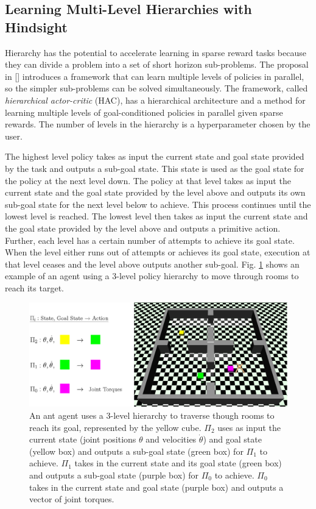 \documentclass[conference]{IEEEtran}
\begin{document}
\subsection{Learning Multi-Level Hierarchies with Hindsight}
Hierarchy has the potential to accelerate learning in sparse reward tasks because they can divide a problem into a set of short horizon sub-problems. The proposal in [\cite{levy2019learning}] introduces a framework that can learn multiple levels of policies in parallel, so the simpler sub-problems can be solved simultaneously. The framework, called \textit{hierarchical actor-critic} (HAC), has a hierarchical architecture and a method for learning multiple levels of goal-conditioned policies in parallel given sparse rewards. The number of levels in the hierarchy is a hyperparameter chosen by the user. 

The highest level policy takes as input the current state and goal state provided by the task and outputs a sub-goal state. This state is used as the goal state for the policy at the next level down. The policy at that level takes as input the current state and the goal state provided by the level above and outputs its own sub-goal state for the next level below to achieve. This process continues until the lowest level is reached. The lowest level then takes as input the current state and the goal state provided by the level above and outputs a primitive action. Further, each level has a certain number of attempts to achieve its goal state. When the level either runs out of attempts or achieves its goal state, execution at that level ceases and the level above outputs another sub-goal. Fig. \ref{fig:mutilevel_her_example} shows an example of an agent using a 3-level policy hierarchy to move through rooms to reach its target.
\begin{figure}[ht]
\centering
\includegraphics[width=0.9\columnwidth]{img/MultiLevelHER_example.png}
\caption{An ant agent uses a 3-level hierarchy to traverse though rooms to reach its goal, represented by the yellow cube. $\Pi_2$ uses as input the current state (joint positions $\theta$ and velocities $\dot{\theta}$) and goal state (yellow box) and outputs a sub-goal state (green box) for $\Pi_1$ to achieve. $\Pi_1$ takes in the current state and its goal state (green box) and outputs a sub-goal state (purple box) for $\Pi_0$ to achieve. $\Pi_0$ takes in the current state and goal state (purple box) and outputs a vector of joint torques.}
\label{fig:mutilevel_her_example}
\end{figure}
\end{document}
